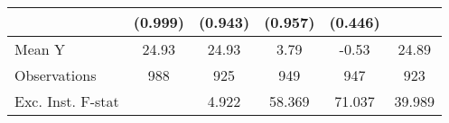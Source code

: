 {\begin{tabular}{l*{5}{c}}
            &     (0.999)         &     (0.943)         &     (0.957)         &     (0.446)         &                     \\
\midrule
Mean Y      &       24.93         &       24.93         &        3.79         &       -0.53         &       24.89         \\
Observations&         988         &         925         &         949         &         947         &         923         \\
Exc. Inst. F-stat&                     &       4.922         &      58.369         &      71.037         &      39.989         \\
\bottomrule
\end{tabular}
}
